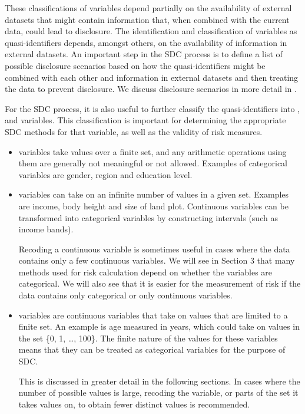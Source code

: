 \documentclass[letterpaper,10pt,english]{sphinxmanual}
\begin{document}
\begin{itemize}
These classifications of variables depend partially on the
availability of external datasets that might contain information
that, when combined with the current data, could lead to disclosure.
The identification and classification of variables as
quasi-identifiers depends, amongst others, on the availability of
information in external datasets. An important step in the SDC
process is to define a list of possible disclosure scenarios based on
how the quasi-identifiers might be combined with each other and
information in external datasets and then treating the data to
prevent disclosure. We discuss disclosure scenarios in more detail in
{\hyperref[\detokenize{measure_risk:disclosure-scenarios}]{}}.

\end{itemize}

For the SDC process, it is also useful to further classify the
quasi-identifiers into ,  and
 variables. This classification is important for
determining the appropriate SDC methods for that variable, as well as
the validity of risk measures.
\begin{itemize}
\item {} 
 variables take values over a finite set, and any
arithmetic operations using them are generally not meaningful or not
allowed. Examples of categorical variables are gender, region and
education level.

\item {} 
 variables can take on an infinite number of values in
a given set. Examples are income, body height and size of land plot.
Continuous variables can be transformed into categorical variables by
constructing intervals (such as income bands). %
\begin{footnote}[1]\sphinxAtStartFootnote
Recoding a continuous variable is sometimes useful in cases where the
data contains only a few continuous variables. We will see in Section
3 that many methods used for risk calculation depend on whether the
variables are categorical. We will also see that it is easier for the
measurement of risk if the data contains only categorical or only
continuous variables.
%
\end{footnote}

\item {} 
 variables are continuous variables that take on
values that are limited to a finite set. An example is age measured
in years, which could take on values in the set \{0, 1, …, 100\}. The
finite nature of the values for these variables means that they can
be treated as categorical variables for the purpose of
SDC. %
\begin{footnote}[2]\sphinxAtStartFootnote
This is discussed in greater detail in the following sections. In
cases where the number of possible values is large, recoding the
variable, or parts of the set it takes values on, to obtain fewer
distinct values is recommended.
%
\end{footnote}

\end{itemize}
\end{document}
